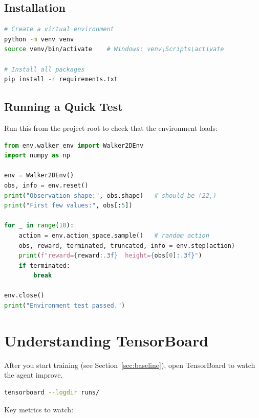 \documentclass[12pt, a4paper]{article}
\begin{document}
\subsection{Installation}

\begin{lstlisting}[language=bash]
# Create a virtual environment
python -m venv venv
source venv/bin/activate    # Windows: venv\Scripts\activate

# Install all packages
pip install -r requirements.txt
\end{lstlisting}

\subsection{Running a Quick Test}

Run this from the project root to check that the environment loads:

\begin{lstlisting}[language=python]
from env.walker_env import Walker2DEnv
import numpy as np

env = Walker2DEnv()
obs, info = env.reset()
print("Observation shape:", obs.shape)   # should be (22,)
print("First few values:", obs[:5])

for _ in range(10):
    action = env.action_space.sample()   # random action
    obs, reward, terminated, truncated, info = env.step(action)
    print(f"reward={reward:.3f}  height={obs[0]:.3f}")
    if terminated:
        break

env.close()
print("Environment test passed.")
\end{lstlisting}

\section{Understanding TensorBoard}

After you start training (see Section~\ref{sec:baseline}), open TensorBoard to watch the agent improve.

\begin{lstlisting}[language=bash]
tensorboard --logdir runs/
\end{lstlisting}

Key metrics to watch:
\end{document}
